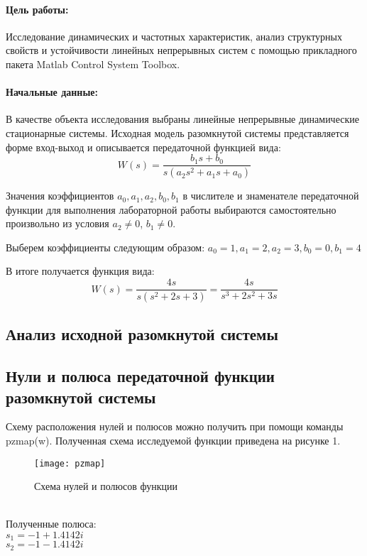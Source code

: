 \documentclass[a4paper, 12pt]{article}
\begin{document}
	
	\paragraph*{Цель работы:}Исследование динамических и частотных характеристик, анализ структурных свойств и устойчивости линейных непрерывных систем с помощью прикладного пакета Matlab Control System Toolbox. 
	\paragraph*{Начальные данные:}В качестве объекта исследования выбраны линейные непрерывные динамические стационарные системы. Исходная модель разомкнутой системы представляется форме вход-выход и описывается передаточной функцией вида:
	\begin{equation}
	W(s)=\frac{b_1s+b_0}{s(a_2s^2+a_1s+a_0)}
	\end{equation}\par
	Значения коэффициентов $a_0,a_1,a_2,b_0,b_1$ в числителе и знаменателе передаточной функции для выполнения лабораторной работы выбираются самостоятельно произвольно из условия $a_2\neq0$, $b_1\neq0$.\par
	Выберем коэффициенты следующим образом: $a_0=1,a_1=2,a_2=3,b_0=0,b_1=4$\par
	В итоге получается функция вида:
	\begin{equation}
	W(s)=\frac{4s}{s(s^2+2s+3)}=\frac{4s}{s^3+2s^2+3s}
	\end{equation}
	\newpage
	\begin{center}
		\section{Анализ исходной разомкнутой системы}
	\end{center}
	\subsection{Нули и полюса передаточной функции разомкнутой системы}
	Схему расположения нулей и полюсов можно получить при помощи команды pzmap(w). Полученная схема исследуемой функции приведена на рисунке 1.
	\begin{figure}[h!]
		\begin{center}
			\texttt{[image: pzmap]}
			\caption{Схема нулей и полюсов функции}
		\end{center}  
	\end{figure}\\
	Полученные полюса:\\
	$s_1=-1 + 1.4142i$\\
	$s_2=-1 - 1.4142i$
	\newpage
\end{document}
